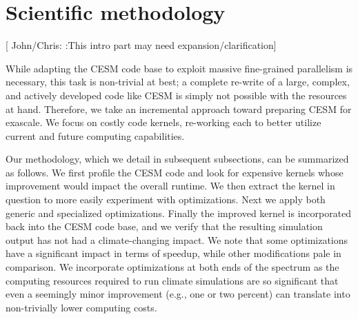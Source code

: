 

\section{Scientific methodology}\label{sec:method}

[{\color{red} John/Chris: }:This intro part may need expansion/clarification]

While adapting the CESM code base to exploit massive fine-grained parallelism is necessary, this task is non-trivial at best; a complete re-write of a large, complex, and actively developed code like CESM is simply not possible with the resources at hand.  Therefore, we take an incremental approach toward preparing CESM for exascale. We focus on costly code kernels, re-working each to better utilize current and future computing capabilities.   

Our methodology, which we detail in subsequent subsections, can be summarized as follows.  We first profile the CESM code and look for expensive kernels whose improvement would impact the overall runtime.  We then extract the kernel in question to more easily experiment with optimizations. Next we apply both generic and specialized optimizations. Finally the improved kernel is incorporated back into the CESM code base, and we verify that the resulting simulation output has not had a climate-changing impact.  We note that some optimizations have a significant impact in terms of speedup, while other modifications pale in comparison. We incorporate optimizations at both ends of the spectrum as the computing resources required to run climate simulations are so significant that even a seemingly minor improvement (e.g., one or two percent) can translate into non-trivially lower computing costs.


